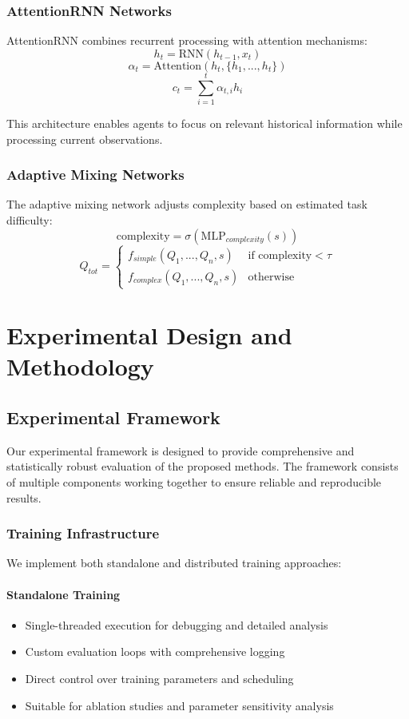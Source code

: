 \documentclass[12pt,a4paper]{report}
\begin{document}
\subsection{AttentionRNN Networks}
AttentionRNN combines recurrent processing with attention mechanisms:
$$h_t = \text{RNN}(h_{t-1}, x_t)$$
$$\alpha_t = \text{Attention}(h_t, \{h_1, ..., h_t\})$$
$$c_t = \sum_{i=1}^t \alpha_{t,i} h_i$$

This architecture enables agents to focus on relevant historical information while processing current observations.

\subsection{Adaptive Mixing Networks}
The adaptive mixing network adjusts complexity based on estimated task difficulty:
$$\text{complexity} = \sigma(\text{MLP}_{complexity}(s))$$
$$Q_{tot} = \begin{cases}
f_{simple}(Q_1, ..., Q_n, s) & \text{if complexity} < \tau \\
f_{complex}(Q_1, ..., Q_n, s) & \text{otherwise}
\end{cases}$$

\chapter{Experimental Design and Methodology}

\section{Experimental Framework}
Our experimental framework is designed to provide comprehensive and statistically robust evaluation of the proposed methods. The framework consists of multiple components working together to ensure reliable and reproducible results.

\subsection{Training Infrastructure}
We implement both standalone and distributed training approaches:

\subsubsection{Standalone Training}
\begin{itemize}
\item Single-threaded execution for debugging and detailed analysis
\item Custom evaluation loops with comprehensive logging
\item Direct control over training parameters and scheduling
\item Suitable for ablation studies and parameter sensitivity analysis
\end{itemize}
\end{document}
